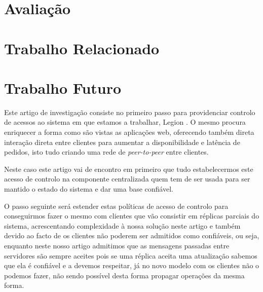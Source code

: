 \documentclass[runningheads,a4paper]{llncs}
\begin{document}
\section{Avaliação}\label{sec:av}

\section{Trabalho Relacionado}\label{sec:related work}

\section{Trabalho Futuro}\label{sec:future work}

Este artigo de investigação consiste no primeiro passo para providenciar controlo de acessos ao sistema em que estamos a trabalhar, Legion \cite{mastersthesis}. O mesmo procura enriquecer a forma como são vistas as aplicações web, oferecendo também direta interação direta entre clientes para aumentar a disponibilidade e latência de pedidos, isto tudo criando uma rede de \textit{peer-to-peer} entre clientes.

Neste caso este artigo vai de encontro em primeiro que tudo estabelecermos este acesso de controlo na componente centralizada quem tem de ser usada para ser mantido o estado do sistema e dar uma base confiável. 

O passo seguinte será estender estas políticas de acesso de controlo para conseguirmos fazer o mesmo com clientes que vão consistir em réplicas parciais do sistema, acrescentando complexidade à nossa solução neste artigo e também devido ao facto de os clientes não poderem ser admitidos como confiáveis, ou seja, enquanto neste nosso artigo admitimos que as mensagens passadas entre servidores são sempre aceites pois se uma réplica aceita uma atualização sabemos que ela é confiável e a devemos respeitar, já no novo modelo com os clientes não o podemos fazer, não sendo possível desta forma propagar operações da mesma forma.



\end{document}
